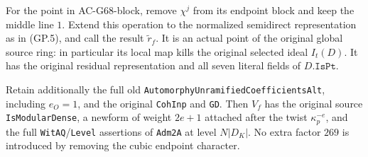 \begin{theorem}
\label{AC-G68-point}
For the point in AC-G68-block, remove \(\chi^j\) from
its endpoint block and keep the middle line \(1\).
Extend this operation to the normalized semidirect
representation as in (GP.5), and call the result
\(\widetilde r_f\). It is an actual point of the
original global source ring: in particular its local
map kills the original selected ideal \(I_t(D)\).
It has the original residual representation and all
seven literal fields of \(D.\texttt{IsPt}\).

Retain additionally the full old
\texttt{AutomorphyUnramifiedCoefficientsAlt}, including
\(e_O=1\), and the original \texttt{CohInp} and
\texttt{GD}. Then \(V_f\) has the original source
\texttt{IsModularDense}, a newform of weight \(2e+1\)
attached after the twist \(\kappa_p^{-e}\), and the
full \texttt{WitAQ}/\texttt{Level} assertions of
\texttt{Adm2A} at level \(N|D_K|\).
No extra factor \(269\) is introduced by removing
the cubic endpoint character.
\end{theorem}
